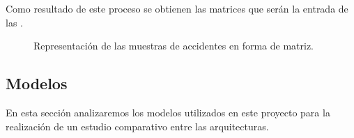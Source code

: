         Como resultado de este proceso se obtienen las matrices que serán la entrada de las .

        \begin{figure}[H]
            \centering
            
            
            

            \caption{Representación de las muestras de accidentes en forma de matriz.}
            \label{SampledImagesExampleImage}
        \end{figure}

    \subsection{Modelos}


        En esta sección analizaremos los modelos utilizados en este proyecto para la realización de un estudio comparativo entre las arquitecturas.


